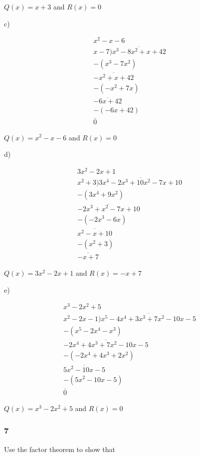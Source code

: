 \documentclass[]{report}
\begin{document}
$Q(x) = x + 3$ and $R(x) = 0$

c)

\begin{align*}
x^2 - x - 6\\
x-7 ) \overline{x^3 - 8x^2 + x + 42}\\
- (x^3 - 7x^2)\\
\overline{-x^2 + x + 42}\\
- (-x^2 + 7x)\\
\overline{-6x + 42}\\
- (-6x + 42) \\
\overline{0}
\end{align*}

$Q(x) = x^2 -x -6$ and $R(x) = 0$

d) 

\begin{align*}
3x^2 - 2x + 1\\
x^2 + 3) \overline{3x^4 - 2x^3 + 10x^2 -7x + 10}\\
-(3x^4 + 9x^2)\\
\overline{-2x^3 + x^2 -7x + 10} \\
-(-2x^3 - 6x)\\
\overline{x^2 - x + 10} \\
- (x^2 + 3) \\
\overline{-x + 7}
\end{align*}

$Q(x) = 3x^2 - 2x + 1$ and $R(x) = -x + 7$

e)

\begin{align*}
x^3 - 2x^2 + 5\\
x^2 -  2x - 1) \overline{x^5 - 4x^4 + 3x^3 + 7x^2 - 10x -5}\\
- (x^5 - 2x^4 - x^3)\\
\overline{-2x^4 +  4x^3 + 7x^2 - 10x - 5} \\
- (-2x^4 + 4x^3 + 2x^2)\\
\overline{5x^2 - 10x - 5}\\
- (5x^2 - 10x - 5)\\
\overline{0}
\end{align*}

$Q(x) = x^3 - 2x^2 + 5$ and $R(x) = 0$


\subsubsection{7}

Use the factor theorem to show that 
\end{document}
